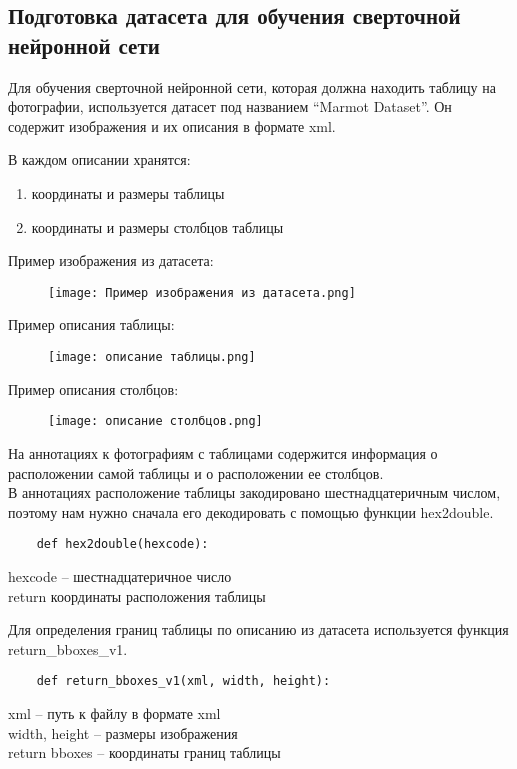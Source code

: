 \documentclass[a4paper, 12pt]{report}
\begin{document}
\subsection*{Подготовка датасета для обучения сверточной нейронной сети}
Для обучения сверточной нейронной сети, которая должна находить таблицу на фотографии, используется датасет под названием “Marmot Dataset”. Он содержит изображения и их описания в формате xml. 

В каждом описании хранятся:
\begin{enumerate}
    \item координаты и размеры таблицы
    \item координаты и размеры столбцов таблицы
\end{enumerate}

\pagebreak
Пример изображения из датасета:
\begin{figure}[ht]
    \texttt{[image: Пример изображения из датасета.png]}
    \caption{}
    \label{fig:my_label}
\end{figure}

\pagebreak
Пример описания таблицы:
\begin{figure}[ht]
    \centering
    \texttt{[image: описание таблицы.png]}
    \caption{}
    \label{fig:my_label}
\end{figure}

Пример описания столбцов:
\begin{figure}[ht]
    \centering
    \texttt{[image: описание столбцов.png]}
    \caption{}
    \label{fig:my_label}
\end{figure}

На аннотациях к фотографиям с таблицами содержится информация о расположении самой таблицы и о расположении ее столбцов.\\
В аннотациях расположение таблицы закодировано шестнадцатеричным числом, поэтому нам нужно сначала его декодировать с помощью функции hex2double.

\begin{lstlisting}
    def hex2double(hexcode):
\end{lstlisting}
hexcode – шестнадцатеричное число\\
return координаты расположения таблицы

Для определения границ таблицы по описанию из датасета используется функция return\_bboxes\_v1.

\begin{lstlisting}
    def return_bboxes_v1(xml, width, height):
\end{lstlisting}
xml – путь к файлу в формате xml\\
width, height – размеры изображения\\
return bboxes – координаты границ таблицы
\end{document}
